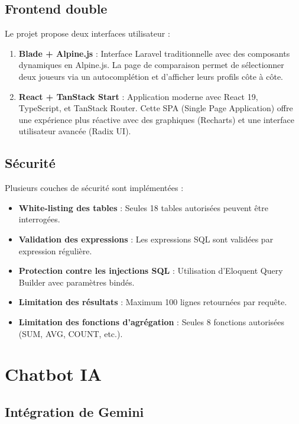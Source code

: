\documentclass[12pt,a4paper]{report}
\begin{document}
\subsection{Frontend double}

Le projet propose deux interfaces utilisateur :

\begin{enumerate}
    \item \textbf{Blade + Alpine.js} : Interface Laravel traditionnelle avec des composants dynamiques en Alpine.js. La page de comparaison permet de sélectionner deux joueurs via un autocomplétion et d'afficher leurs profils côte à côte.
    \item \textbf{React + TanStack Start} : Application moderne avec React 19, TypeScript, et TanStack Router. Cette SPA (Single Page Application) offre une expérience plus réactive avec des graphiques (Recharts) et une interface utilisateur avancée (Radix UI).
\end{enumerate}

\subsection{Sécurité}

Plusieurs couches de sécurité sont implémentées :

\begin{itemize}
    \item \textbf{White-listing des tables} : Seules 18 tables autorisées peuvent être interrogées.
    \item \textbf{Validation des expressions} : Les expressions SQL sont validées par expression régulière.
    \item \textbf{Protection contre les injections SQL} : Utilisation d'Eloquent Query Builder avec paramètres bindés.
    \item \textbf{Limitation des résultats} : Maximum 100 lignes retournées par requête.
    \item \textbf{Limitation des fonctions d'agrégation} : Seules 8 fonctions autorisées (SUM, AVG, COUNT, etc.).
\end{itemize}

\section{Chatbot IA}

\subsection{Intégration de Gemini}
\end{document}
